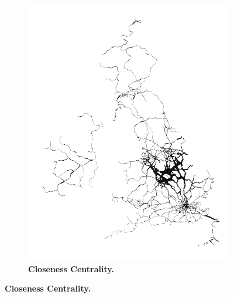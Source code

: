 \begin{figure}[H]
\begin{subfigure}[b]{.49\textwidth}
         \includegraphics[width=\textwidth]{rail/centrality.png}
        \caption{ \textbf{Closeness Centrality.}}
\end{subfigure}


\end{figure}
